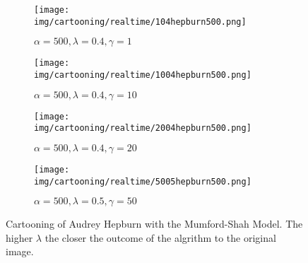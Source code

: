 \begin{figure}[ht]
    \centering
    \begin{subfigure}[b]{0.45\textwidth}
        \texttt{[image: img/cartooning/realtime/104hepburn500.png]}
        \caption{$\alpha = 500, \lambda = 0.4, \gamma = 1$}
    \end{subfigure}
    \begin{subfigure}[b]{0.45\textwidth}
        \texttt{[image: img/cartooning/realtime/1004hepburn500.png]}
        \caption{$\alpha = 500, \lambda = 0.4, \gamma = 10$}
    \end{subfigure}
    \begin{subfigure}[b]{0.45\textwidth}
        \texttt{[image: img/cartooning/realtime/2004hepburn500.png]}
        \caption{$\alpha = 500, \lambda = 0.4, \gamma = 20$}
    \end{subfigure}
    \begin{subfigure}[b]{0.45\textwidth}
        \texttt{[image: img/cartooning/realtime/5005hepburn500.png]}
        \caption{$\alpha = 500, \lambda = 0.5, \gamma = 50$}
    \end{subfigure}
    \caption{Cartooning of Audrey Hepburn with the Mumford-Shah Model. The higher $\lambda$ the closer the outcome of the algrithm to the original image.}
\label{fig:cartooning_hepburn_realtime}
\end{figure}